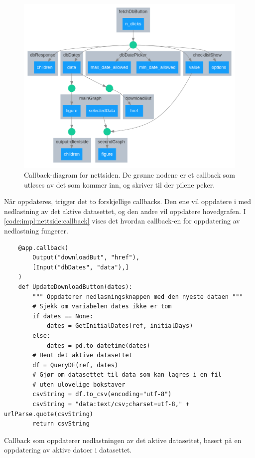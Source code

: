 \begin{figure}[!htbp]
    \centering
    \includegraphics[width=.7\textwidth]{implementering/nettside/callbacks.png}
    \caption{Callback-diagram for nettsiden. De grønne nodene er et callback som utløses av det som kommer inn, og skriver til der pilene peker.}
    \label{fig:impl:nettside:callback}
\end{figure}

\newpage
Når  oppdateres, trigger det to forskjellige callbacks. 
Den ene vil oppdatere  i  med nedlastning av det aktive datasettet, og den andre vil oppdatere hovedgrafen.
I \autoref{code:impl:nettside:callback} vises det hvordan callback-en for oppdatering av nedlastning fungerer. 

\begin{listing}[!htb]
\begin{verbatim} 
    @app.callback(
        Output("downloadBut", "href"),
        [Input("dbDates", "data"),]
    )
    def UpdateDownloadButton(dates):
        """ Oppdaterer nedlasningsknappen med den nyeste dataen """
        # Sjekk om variabelen dates ikke er tom
        if dates == None:
            dates = GetInitialDates(ref, initialDays)
        else:
            dates = pd.to_datetime(dates)
        # Hent det aktive datasettet
        df = QueryDF(ref, dates)
        # Gjør om datasettet til data som kan lagres i en fil 
        # uten ulovelige bokstaver
        csvString = df.to_csv(encoding="utf-8")
        csvString = "data:text/csv;charset=utf-8," + urlParse.quote(csvString)
        return csvString
\end{verbatim}
\caption{Callback som oppdaterer nedlastningen av det aktive datasettet, basert på en oppdatering av aktive datoer i datasettet.}
\label{code:impl:nettside:callback}
\end{listing}

